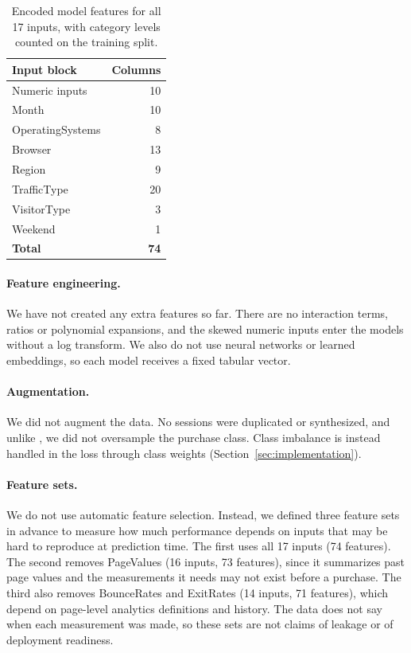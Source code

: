 \documentclass[11pt]{article}
\begin{document}
\begin{table}[t]
  \centering
  \small
  \begin{tabular}{lr}
    \hline
    \textbf{Input block} & \textbf{Columns} \\
    \hline
    Numeric inputs & 10 \\
    Month & 10 \\
    OperatingSystems & 8 \\
    Browser & 13 \\
    Region & 9 \\
    TrafficType & 20 \\
    VisitorType & 3 \\
    Weekend & 1 \\
    \hline
    \textbf{Total} & \textbf{74} \\
    \hline
  \end{tabular}
  \caption{\label{tab:encoded}
    Encoded model features for all 17 inputs, with category levels counted
    on the training split.}
\end{table}

\paragraph{Feature engineering.} We have not created any extra features so
far. There are no interaction terms, ratios or polynomial expansions, and the
skewed numeric inputs enter the models without a log transform. We also do
not use neural networks or learned embeddings, so each model receives a fixed
tabular vector.

\paragraph{Augmentation.} We did not augment the data. No sessions were
duplicated or synthesized, and unlike \citet{sakar2019realtime}, we did not
oversample the purchase class. Class imbalance is instead handled in the loss
through class weights (Section~\ref{sec:implementation}).

\paragraph{Feature sets.} We do not use automatic feature selection. Instead,
we defined three feature sets in advance to measure how much performance
depends on inputs that may be hard to reproduce at prediction time. The first
uses all 17 inputs (74 features). The second removes PageValues (16 inputs,
73 features), since it summarizes past page values and the measurements it
needs may not exist before a purchase. The third also removes BounceRates and
ExitRates (14 inputs, 71 features), which depend on page-level analytics
definitions and history. The data does not say when each measurement was
made, so these sets are not claims of leakage or of deployment readiness.
\end{document}
